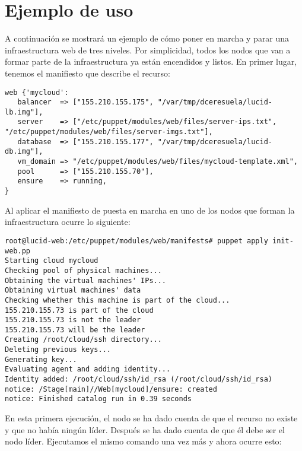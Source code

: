 \chapter{Ejemplo de uso}
\label{anx:ejemplo}


A continuación se mostrará un ejemplo de cómo poner en marcha y parar una infraestructura web de tres niveles. Por simplicidad, todos los nodos que van a formar parte de la infraestructura ya están encendidos y listos. En primer lugar, tenemos el manifiesto que describe el recurso:

\begin{lstlisting}
web {'mycloud':
   balancer  => ["155.210.155.175", "/var/tmp/dceresuela/lucid-lb.img"],
   server    => ["/etc/puppet/modules/web/files/server-ips.txt", "/etc/puppet/modules/web/files/server-imgs.txt"],
   database  => ["155.210.155.177", "/var/tmp/dceresuela/lucid-db.img"],
   vm_domain => "/etc/puppet/modules/web/files/mycloud-template.xml",
   pool      => ["155.210.155.70"],
   ensure    => running,
}
\end{lstlisting}

Al aplicar el manifiesto de puesta en marcha en uno de los nodos que forman la infraestructura ocurre lo siguiente:

\begin{lstlisting}
root@lucid-web:/etc/puppet/modules/web/manifests# puppet apply init-web.pp 
Starting cloud mycloud
Checking pool of physical machines...
Obtaining the virtual machines' IPs...
Obtaining virtual machines' data
Checking whether this machine is part of the cloud...
155.210.155.73 is part of the cloud
155.210.155.73 is not the leader
155.210.155.73 will be the leader
Creating /root/cloud/ssh directory...
Deleting previous keys...
Generating key...
Evaluating agent and adding identity...
Identity added: /root/cloud/ssh/id_rsa (/root/cloud/ssh/id_rsa)
notice: /Stage[main]//Web[mycloud]/ensure: created
notice: Finished catalog run in 0.39 seconds
\end{lstlisting}

En esta primera ejecución, el nodo se ha dado cuenta de que el recurso no existe y que no había ningún líder. Después se ha dado cuenta de que él debe ser el nodo líder. Ejecutamos el mismo comando una vez más y ahora ocurre esto:

\pagebreak


